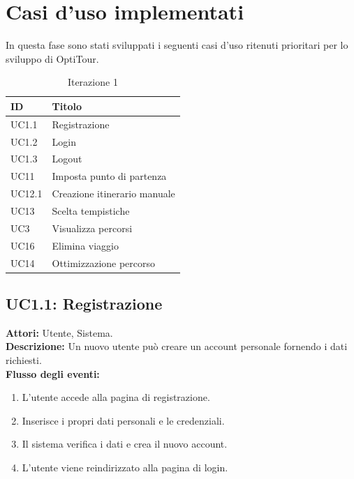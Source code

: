 \section{Casi d'uso implementati}
In questa fase sono stati sviluppati i seguenti casi d'uso ritenuti prioritari per lo sviluppo di OptiTour.

\begin{table}[hbt!]
    \centering
    \begin{tabular}{ll}
        \hline
        \textbf{ID} & \textbf{Titolo} \\
        \hline
        UC1.1 & Registrazione \\
        UC1.2 & Login \\
        UC1.3 & Logout \\
        UC11 & Imposta punto di partenza \\
        UC12.1 & Creazione itinerario manuale \\
        UC13 & Scelta tempistiche \\
        UC3 & Visualizza percorsi \\
        UC16 & Elimina viaggio \\
        UC14 & Ottimizzazione percorso \\
        \hline
    \end{tabular}
    \caption{Iterazione 1}
\end{table}

\subsection*{UC1.1: Registrazione}
\textbf{Attori:} Utente, Sistema. \\
\textbf{Descrizione:} Un nuovo utente può creare un account personale fornendo i dati richiesti. \\
\textbf{Flusso degli eventi:}
\begin{enumerate}
    \setlength{\itemsep}{0pt}
    \setlength{\parskip}{0pt}
    \item L'utente accede alla pagina di registrazione.
    \item Inserisce i propri dati personali e le credenziali.
    \item Il sistema verifica i dati e crea il nuovo account.
    \item L'utente viene reindirizzato alla pagina di login.
\end{enumerate}

